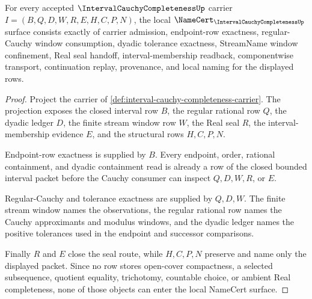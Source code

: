 \begin{theorem}
\label{thm:interval-cauchy-completeness-namecert-obligations}
For every accepted $\IntervalCauchyCompletenessUp$ carrier $I=(B,Q,D,W,R,E,H,C,P,N)$, the local $\NameCert_{\IntervalCauchyCompletenessUp}$ surface consists exactly of carrier admission, endpoint-row exactness, regular-Cauchy window consumption, dyadic tolerance exactness, StreamName window confinement, Real seal handoff, interval-membership readback, componentwise transport, continuation replay, provenance, and local naming for the displayed rows.
\end{theorem}
\begin{proof}
Project the carrier of \autoref{def:interval-cauchy-completeness-carrier}. The projection exposes the closed interval row $B$, the regular rational row $Q$, the dyadic ledger $D$, the finite stream window row $W$, the Real seal $R$, the interval-membership evidence $E$, and the structural rows $H,C,P,N$.

Endpoint-row exactness is supplied by $B$. Every endpoint, order, rational containment, and dyadic containment read is already a row of the closed bounded interval packet before the Cauchy consumer can inspect $Q,D,W,R$, or $E$.

Regular-Cauchy and tolerance exactness are supplied by $Q,D,W$. The finite stream window names the observations, the regular rational row names the Cauchy approximants and modulus windows, and the dyadic ledger names the positive tolerances used in the endpoint and successor comparisons.

Finally $R$ and $E$ close the seal route, while $H,C,P,N$ preserve and name only the displayed packet. Since no row stores open-cover compactness, a selected subsequence, quotient equality, trichotomy, countable choice, or ambient Real completeness, none of those objects can enter the local NameCert surface.
\end{proof}

